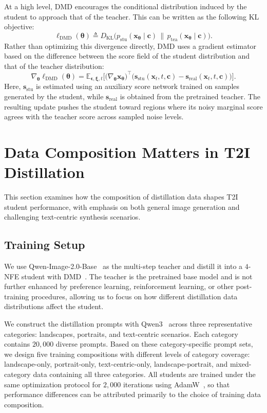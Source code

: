 \documentclass{article}
\begin{document}
At a high level, DMD encourages the conditional distribution induced by the student to approach that of the teacher. This can be written as the following KL objective:
\begin{equation}
\ell_{\text{DMD}}(\bm{\theta})
\triangleq
D_{\mathrm{KL}}
\big(
p_{\text{stu}}(\bm{x}_{\bm{\theta}}\mid \bm c)
\,\|\,
p_{\text{tea}}(\bm{x}_{\bm{\theta}}\mid \bm c)
\big).
\end{equation}
Rather than optimizing this divergence directly, DMD uses a gradient estimator based on the difference between the score field of the student distribution and that of the teacher distribution:
\begin{equation}
\nabla_{\bm \theta} \ell_{\text{DMD}}(\bm\theta)
=
\mathbb{E}_{\bm{\epsilon},\bm{\xi},t}
\Big[\big(\nabla_{\bm{\theta}} \bm{x}_{\bm{\theta}}\big)^\intercal
\big(
\bm s_{\text{stu}}(\bm{x}_t,t,\bm c)
-
\bm s_{\text{real}}(\bm{x}_t,t,\bm c)
\big)
\Big].
\label{eq:dmd}
\end{equation}
Here, $\bm s_{\text{stu}}$ is estimated using an auxiliary score network trained on samples generated by the student, while $\bm s_{\text{real}}$ is obtained from the pretrained teacher. The resulting update pushes the student toward regions where its noisy marginal score agrees with the teacher score across sampled noise levels.




\section{Data Composition Matters in T2I Distillation}
\label{sec:data_composition}
This section examines how the composition of distillation data shapes T2I student performance, with emphasis on both general image generation and challenging text-centric synthesis scenarios.


\subsection{Training Setup}
We use Qwen-Image-2.0-Base~\citep{zhao2026qwen} as the multi-step teacher and distill it into a $4$-NFE student with DMD~\citep{yin2024improved}. The teacher is the pretrained base model and is not further enhanced by preference learning, reinforcement learning, or other post-training procedures, allowing us to focus on how different distillation data distributions affect the student.

We construct the distillation prompts with Qwen3~\citep{yang2025qwen3} across three representative categories: landscapes, portraits, and text-centric scenarios. Each category contains $20{,}000$ diverse prompts. Based on these category-specific prompt sets, we design five training compositions with different levels of category coverage: landscape-only, portrait-only, text-centric-only, landscape-portrait, and mixed-category data containing all three categories. All students are trained under the same optimization protocol for $2{,}000$ iterations using AdamW~\citep{loshchilov2017decoupled}, so that performance differences can be attributed primarily to the choice of training data composition.
\end{document}
